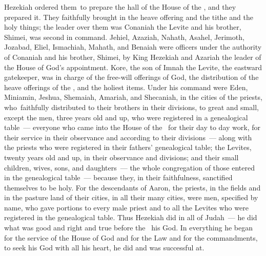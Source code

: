 \begin{inparaenum}
   Hezekiah ordered them\understood{}\ to prepare the hall of the House of the \lord, and they prepared it.\understood{}%
   They faithfully brought in the heave offering and the tithe and the holy things; the leader over them was Conaniah the Levite and his brother, Shimei, was second in command.\understood{}%
   Jehiel, Azaziah, Nahath, Asahel, Jerimoth, Jozabad, Eliel, Ismachiah, Mahath, and Benaiah were officers under the authority of Conaniah and his brother, Shimei, by King Hezekiah and Azariah the leader of the House of God's appointment.%
   Kore, the son of Imnah the Levite, the eastward gatekeeper, was in charge of the free-will offerings of God, the distribution of the heave offerings of the \lord, and the holiest items.%
   Under his command were Eden, Miniamin, Jeshua, Shemaiah, Amariah, and Shecaniah, in the cities of the priests, who\understood{}\ faithfully distributed to their brothers in their divisions, to great and small,%
   except the men, three years old and up, who were registered in a genealogical table~--- everyone who came into the House of the \lord\ for their day to day work, for their service in their observance and according to their divisions~---%
   along with the priests who were registered in their fathers' genealogical table; the Levites, twenty years old and up, in their observance and divisions;%
   and their small children, wives, sons, and daughters~--- the whole congregation of those entered in the genealogical table~--- because they, in their faithfulness, sanctified themselves to be holy.%
   For the descendants of Aaron, the priests, in the fields and in the pasture land of their cities, in all their many cities, were men, specified by name, who gave portions to every male priest and to all the Levites who were registered in the genealogical table.%
   Thus Hezekiah did in all of Judah~--- he did what was good and right and true before the \lord\ his God.%
   In everything he began for the service of the House of God and for the Law and for the commandments, to seek his God with all his heart, he did and was successful at.\understood{}%
\end{inparaenum}
